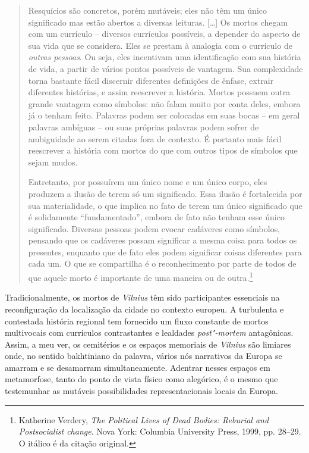 \begin{quote}
Resquícios são concretos, porém mutáveis; eles não têm um único
significado mas estão abertos a diversas leituras. [\ldots{}] Os mortos chegam
com um currículo -- diversos currículos possíveis, a depender do aspecto
de sua vida que se considera. Eles se prestam à analogia com o currículo
de \textit{outras pessoas}. Ou seja, eles incentivam uma identificação com
sua história de vida, a partir de vários pontos possíveis de vantagem.
Sua complexidade torna bastante fácil discernir diferentes definições de
ênfase, extrair diferentes histórias, e assim reescrever a história.
Mortos possuem outra grande vantagem como símbolos: não falam muito por
conta deles, embora já o tenham feito. Palavras podem ser colocadas em
suas bocas -- em geral palavras ambíguas -- ou suas próprias palavras
podem sofrer de ambiguidade ao serem citadas fora de contexto. É
portanto mais fácil reescrever a história com mortos do que com outros
tipos de símbolos que sejam mudos.

Entretanto, por possuírem um único nome e um único corpo, eles produzem
a ilusão de terem só um significado. Essa ilusão é fortalecida
por sua materialidade, o que implica no fato de terem um único
significado que é solidamente ``fundamentado'', embora de fato não
tenham esse único significado. Diversas pessoas podem evocar cadáveres
como símbolos, pensando que os cadáveres possam significar a mesma coisa
para todos os presentes, enquanto que de fato eles podem significar
coisas diferentes para cada um. O que se compartilha é o
reconhecimento por parte de todos de que aquele morto é
importante de uma maneira ou de outra.\footnote{Katherine Verdery, \textit{The Political Lives of Dead Bodies: Reburial and Postsocialist change}. Nova York: Columbia University Press, 1999, pp. 28--29. O itálico é da citação original.} 
\end{quote}

Tradicionalmente, os mortos de \textit{Vilnius} têm sido participantes essenciais
na reconfiguração da localização da cidade no contexto europeu. A
turbulenta e contestada história regional tem fornecido um fluxo
constante de mortos multivocais com currículos contrastantes e lealdades
\textit{post"-mortem} antagônicas. Assim, a meu ver, os cemitérios e os
espaços memoriais de \textit{Vilnius} são limiares onde, no sentido bakhtiniano
da palavra, vários nós narrativos da Europa se amarram e se desamarram
simultaneamente. Adentrar nesses espaços em metamorfose, tanto do ponto
de vista físico como alegórico, é o mesmo que testemunhar as mutáveis
possibilidades representacionais locais da Europa.

